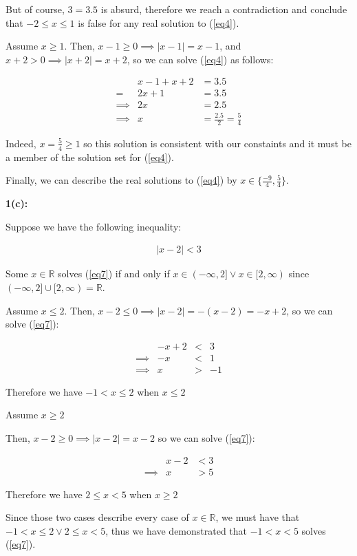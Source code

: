 \documentclass{article}
\newcommand{\reals}{\mathbb{R}}
\begin{document}
But of course, $3 = 3.5$ is absurd,
therefore we reach a contradiction
and conclude that $-2 \le x \le 1$ is false for any real solution to (\ref{eq4}).

Assume $x \geq 1$.
Then, $x-1 \geq 0 \implies |x-1| = x-1$,
and $x+2 > 0 \implies |x+2| = x+2$,
so we can solve (\ref{eq4}) as follows:

\begin{align}
	& x-1 +x+2 & = 3.5 \\
	= & 2x+1 & = 3.5 \\
	\implies & 2x & = 2.5 \\
	\label{eq6} \implies & x & = \frac{2.5}{2} = \frac{5}{4}
\end{align}

Indeed, $x = \frac{5}{4} \geq 1$ so this solution is consistent
with our constaints and it must be a member of the solution set for (\ref{eq4}).

Finally, we can describe the real solutions
to (\ref{eq4}) by $x \in \{ \frac{-9}{4}, \frac{5}{4} \}$.

\medskip
\textbf{1(c):}

Suppose we have the following inequality: 

\begin{align} \label{eq7}
	|x-2| < 3
\end{align}

Some $x \in \reals$ solves (\ref{eq7}) if and only if
$x \in (-\infty,2] \lor x \in [2, \infty)$
since $(-\infty,2] \cup [2,\infty) = \reals$.


Assume $x \le 2$.
Then, $x - 2 \le 0 \implies |x-2| = -(x-2) = -x+2$,
so we can solve (\ref{eq7}):

\begin{align}
	&-x+2 &< &3 \\
	\implies &-x &< &1 \\
	\implies &x & > &-1
\end{align}

Therefore we have $-1 < x \le 2$ when $x \le 2$

Assume $x \geq 2$

Then, $x - 2 \geq 0 \implies |x-2| = x-2$
so we can solve (\ref{eq7}):

\begin{align}
	&x-2 &< 3 \\
	\implies &x &> 5
\end{align}

Therefore we have $2 \le x < 5$ when $x \geq 2$

Since those two cases describe every case of $x \in \reals$,
we must have that $-1 < x \le 2 \lor 2 \le x < 5$,
thus we have demonstrated that $-1 < x < 5$ solves (\ref{eq7}).
\end{document}
